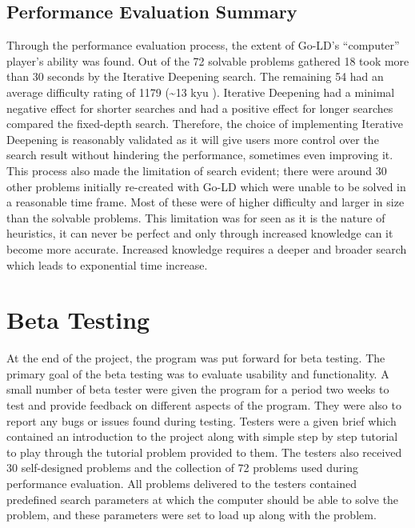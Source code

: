 \documentclass{l4proj}
\begin{document}
\subsection{Performance Evaluation Summary}

Through the performance evaluation process, the extent of Go-LD’s “computer” player’s ability was found. Out of the 72 solvable problems gathered 18 took more than 30 seconds by the Iterative Deepening search. The remaining 54 had an average difficulty rating of 1179 (\textasciitilde 13 kyu ). Iterative Deepening had a minimal negative effect for shorter searches and had a positive effect for longer searches compared the fixed-depth search. Therefore, the choice of implementing Iterative Deepening is reasonably validated as it will give users more control over the search result without hindering the performance, sometimes even improving it. This process also made the limitation of search evident; there were around 30 other problems initially re-created with Go-LD which were unable to be solved in a reasonable time frame. Most of these were of higher difficulty and larger in size than the solvable problems. This limitation was for seen as it is the nature of heuristics, it can never be perfect and only through increased knowledge can it become more accurate. Increased knowledge requires a deeper and broader search which leads to exponential time increase.



\section{Beta Testing}
At the end of the project, the program was put forward for beta testing. The primary goal of the beta testing was to evaluate usability and functionality. A small number of beta tester were given the program for a period two weeks to test and provide feedback on different aspects of the program. They were also to report any bugs or issues found during testing. Testers were a given brief which contained an introduction to the project along with simple step by step tutorial to play through the tutorial problem provided to them. The testers also received 30 self-designed problems and the collection of 72 problems used during performance evaluation. All problems delivered to the testers contained predefined search parameters at which the computer should be able to solve the problem, and these parameters were set to load up along with the problem.
\end{document}
